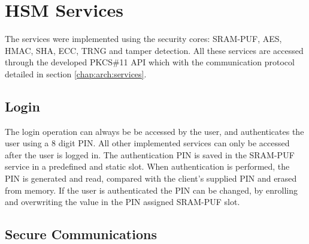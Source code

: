 
\section{HSM Services}\label{chap:implementation:services}

The services were implemented using the security cores: SRAM-PUF, AES, HMAC, SHA, ECC, TRNG and tamper detection.
All these services are accessed through the developed PKCS\#11 API which with the communication protocol detailed in section \ref{chap:arch:services}.

\subsection{Login}\label{chap:implementation:services:authentication}

The login operation can always be be accessed by the user, and authenticates the user using a 8 digit PIN. All other implemented services can only be accessed after the user is logged in.
The authentication PIN is saved in the SRAM-PUF service in a predefined and static slot. When authentication is performed, the PIN is generated and read, compared with the client's supplied PIN and erased from memory.
If the user is authenticated the PIN can be changed, by enrolling and overwriting the value in the PIN assigned SRAM-PUF slot.

\subsection{Secure Communications}\label{chap:implementation:services:secure}

